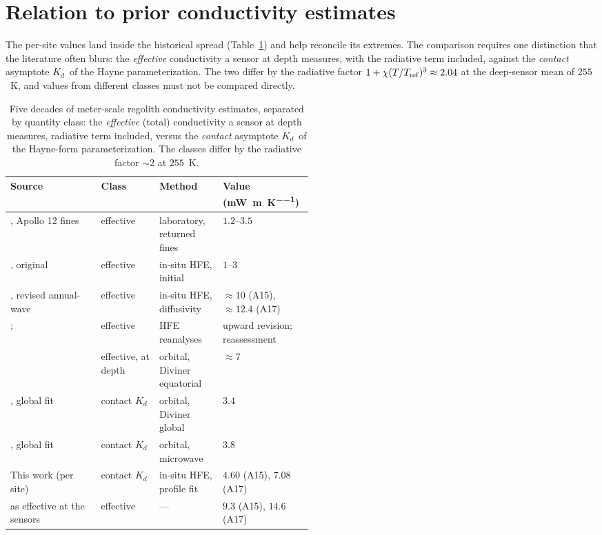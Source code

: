 \documentclass[11pt,a4paper,oneside]{report}
\newcommand{\Kd}{\ensuremath{K_d}}
\newcommand{\mWmK}{\si{\milli\watt\per\meter\per\kelvin}}
\begin{document}
\section{Relation to prior conductivity estimates}\label{sec:priorwork}
The per-site values land inside the historical spread
(Table~\ref{tab:prior}) and help reconcile its extremes. The
comparison requires one distinction that the literature often blurs:
the \emph{effective} conductivity a sensor at depth measures, with
the radiative term included, against the \emph{contact} asymptote
\Kd\ of the Hayne parameterization. The two differ by the radiative
factor $1+\chi(T/T_{\rm ref})^3\approx2.04$ at the deep-sensor mean
of $255$~K, and values from different classes must not be compared
directly.

\begin{table}[htbp]
  \centering\small
  \caption[Five decades of meter-scale conductivity
  estimates]{Five decades of meter-scale regolith conductivity
  estimates, separated by quantity class: the \emph{effective}
  (total) conductivity a sensor at depth measures, radiative term
  included, versus the \emph{contact} asymptote \Kd\ of the
  Hayne-form parameterization. The classes differ by the radiative
  factor ${\sim}2$ at $255$~K.}
  \label{tab:prior}
  \begin{tabular}{@{}p{0.30\linewidth}lp{0.21\linewidth}l@{}}
    \toprule
    Source & Class & Method & Value (\mWmK) \\
    \midrule
    \citet{cremers1971}, Apollo 12 fines & effective & laboratory, returned fines & $1.2$--$3.5$ \\
    \citet{langseth1972,langseth1976}, original & effective & in-situ HFE, initial & $1$--$3$ \\
    \citet{langseth1976}, revised annual-wave & effective & in-situ HFE, diffusivity & ${\approx}10$ (A15), ${\approx}12.4$ (A17) \\
    \citet{keihm1984}; \citet{grott2010} & effective & HFE reanalyses & upward revision; reassessment \\
    \citet{vasavada2012} & effective, at depth & orbital, Diviner equatorial & ${\approx}7$ \\
    \citet{hayne2017}, global fit & contact \Kd & orbital, Diviner global & $3.4$ \\
    \citet{feng2020}, global fit & contact \Kd & orbital, microwave & $3.8$ \\
    \midrule
    This work (per site) & contact \Kd & in-situ HFE, profile fit & $4.60$ (A15), $7.08$ (A17) \\
    \quad as effective at the sensors & effective & --- & $9.3$ (A15), $14.6$ (A17) \\
    \bottomrule
  \end{tabular}
\end{table}
\end{document}
